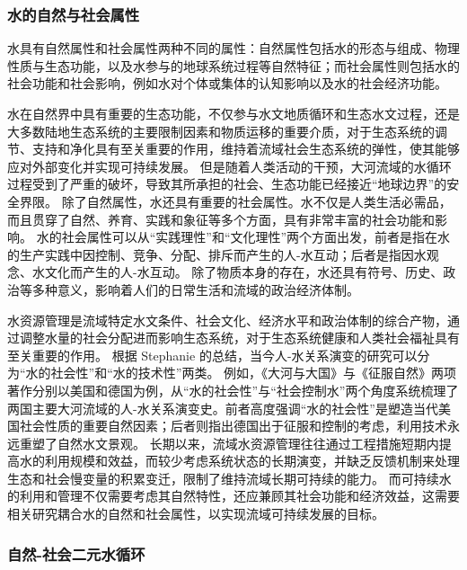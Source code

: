 \subsubsection*{水的自然与社会属性}

水具有自然属性和社会属性两种不同的属性\cite{ning2004}：自然属性包括水的形态与组成、物理性质与生态功能，以及水参与的地球系统过程等自然特征；而社会属性则包括水的社会功能和社会影响，例如水对个体或集体的认知影响以及水的社会经济功能。

水在自然界中具有重要的生态功能，不仅参与水文地质循环和生态水文过程，还是大多数陆地生态系统的主要限制因素和物质运移的重要介质，对于生态系统的调节、支持和净化具有至关重要的作用，维持着流域社会生态系统的弹性，使其能够应对外部变化并实现可持续发展\cite{gleeson2020a}。
但是随着人类活动的干预，大河流域的水循环过程受到了严重的破坏，导致其所承担的社会、生态功能已经接近“地球边界”的安全界限\cite{gleeson2020}。
除了自然属性，水还具有重要的社会属性。水不仅是人类生活必需品，而且贯穿了自然、养育、实践和象征等多个方面，具有非常丰富的社会功能和影响\cite{zhangyahui2008}。
水的社会属性可以从“实践理性”和“文化理性”两个方面出发，前者是指在水的生产实践中因控制、竞争、分配、排斥而产生的人-水互动；后者是指因水观念、水文化而产生的人-水互动\cite{zhangyahui2008}。
除了物质本身的存在，水还具有符号、历史、政治等多种意义，影响着人们的日常生活和流域的政治经济体制\cite{ballestero2019}。

水资源管理是流域特定水文条件、社会文化、经济水平和政治体制的综合产物，通过调整水量的社会分配进而影响生态系统，对于生态系统健康和人类社会福祉具有至关重要的作用。
根据 Stephanie 的总结\cite{scarrow2021}，当今人-水关系演变的研究可以分为“水的社会性”和“水的技术性”两类。
例如，《大河与大国》\cite{MaDing2021}与《征服自然》\cite{DaWei2019}两项著作分别以美国和德国为例，从“水的社会性”与“社会控制水”两个角度系统梳理了两国主要大河流域的人-水关系演变史。前者高度强调“水的社会性”是塑造当代美国社会性质的重要自然因素；后者则指出德国出于征服和控制的考虑，利用技术永远重塑了自然水文景观。
长期以来，流域水资源管理往往通过工程措施短期内提高水的利用规模和效益，而较少考虑系统状态的长期演变，并缺乏反馈机制来处理生态和社会慢变量的积累变迁，限制了维持流域长期可持续的能力\cite{falkenmark2021}。
而可持续水的利用和管理不仅需要考虑其自然特性，还应兼顾其社会功能和经济效益，这需要相关研究耦合水的自然和社会属性，以实现流域可持续发展的目标。

\subsubsection*{自然-社会二元水循环}


